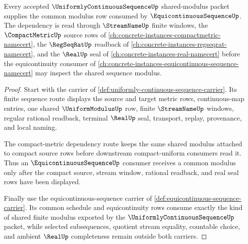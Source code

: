 \begin{theorem}
\label{thm:uniformly-continuous-sequence-equicontinuous-dependency}
Every accepted $\UniformlyContinuousSequenceUp$ shared-modulus packet supplies the common modulus row consumed by $\EquicontinuousSequenceUp$. The dependency is read through $\StreamNameUp$ finite windows, the $\CompactMetricUp$ source rows of \autoref{ch:concrete-instances-compactmetric-namecert}, the $\RegSeqRatUp$ readback of \autoref{ch:concrete-instances-regseqrat-namecert}, and the $\RealUp$ seal of \autoref{ch:concrete-instances-real-namecert} before the equicontinuity consumer of \autoref{ch:concrete-instances-equicontinuous-sequence-namecert} may inspect the shared sequence modulus.
\end{theorem}
\begin{proof}
Start with the carrier of \autoref{def:uniformly-continuous-sequence-carrier}. Its finite sequence route displays the source and target metric rows, continuous-map entries, one shared $\UniformModulusUp$ row, finite $\StreamNameUp$ windows, regular rational readback, terminal $\RealUp$ seal, transport, replay, provenance, and local naming.

The compact-metric dependency route keeps the same shared modulus attached to compact source rows before downstream compact-uniform consumers read it. Thus an $\EquicontinuousSequenceUp$ consumer receives a common modulus only after the compact source, stream window, rational readback, and real seal rows have been displayed.

Finally use the equicontinuous-sequence carrier of \autoref{def:equicontinuous-sequence-carrier}. Its common schedule and equicontinuity rows consume exactly the kind of shared finite modulus exported by the $\UniformlyContinuousSequenceUp$ packet, while selected subsequences, quotient stream equality, countable choice, and ambient $\RealUp$ completeness remain outside both carriers.
\end{proof}

